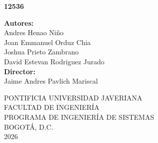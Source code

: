 \begin{titlepage}
    \begin{center}
        \vspace*{1cm}

        \Huge
        \textbf{12536}

        \vspace{0.5cm}
        \LARGE
        
        \thetitle
        
        \vspace{1.5cm}
        \large
        \textbf{Autores:} \\
        Andres Henao Niño \\
        Joan Emmanuel Orduz Chia \\
        Joshua Prieto Zambrano \\
        David Estevan Rodriguez Jurado \\
        
        \vspace{1.5cm}
        \textbf{Director:} \\
        Jaime Andres Pavlich Mariscal \\
        
        \vspace{0.5cm}

        
        PONTIFICIA UNIVERSIDAD JAVERIANA \\
        FACULTAD DE INGENIERÍA \\
        PROGRAMA DE INGENIERÍA DE SISTEMAS \\

        \vspace{0.5cm}
        BOGOTÁ, D.C. \\
        2026
        
    \end{center}
\end{titlepage}
